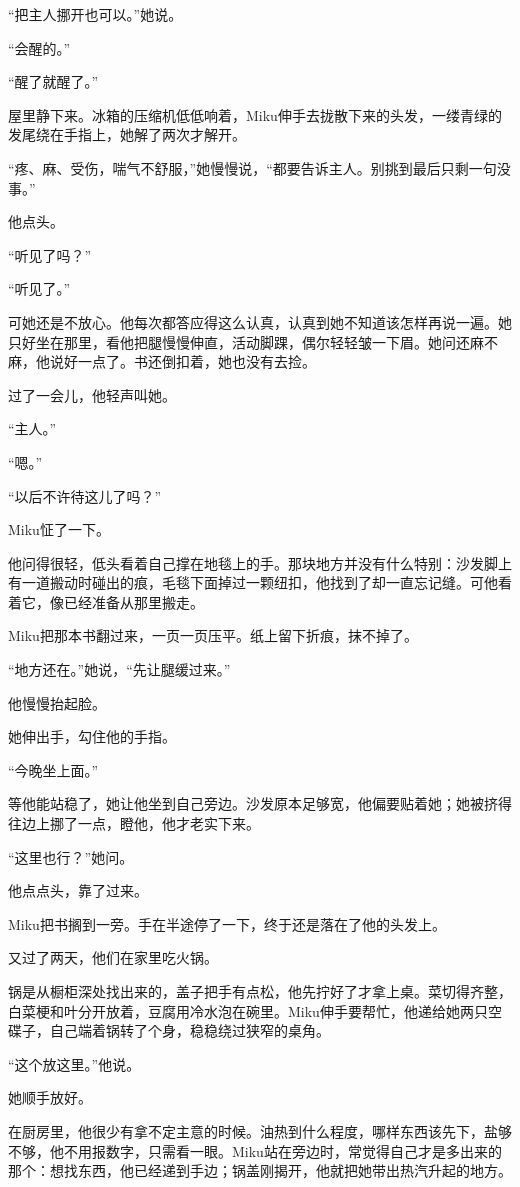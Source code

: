 “把主人挪开也可以。”她说。

“会醒的。”

“醒了就醒了。”

屋里静下来。冰箱的压缩机低低响着，Miku伸手去拢散下来的头发，一缕青绿的发尾绕在手指上，她解了两次才解开。

“疼、麻、受伤，喘气不舒服，”她慢慢说，“都要告诉主人。别挑到最后只剩一句没事。”

他点头。

“听见了吗？”

“听见了。”

可她还是不放心。他每次都答应得这么认真，认真到她不知道该怎样再说一遍。她只好坐在那里，看他把腿慢慢伸直，活动脚踝，偶尔轻轻皱一下眉。她问还麻不麻，他说好一点了。书还倒扣着，她也没有去捡。

过了一会儿，他轻声叫她。

“主人。”

“嗯。”

“以后不许待这儿了吗？”

Miku怔了一下。

他问得很轻，低头看着自己撑在地毯上的手。那块地方并没有什么特别：沙发脚上有一道搬动时碰出的痕，毛毯下面掉过一颗纽扣，他找到了却一直忘记缝。可他看着它，像已经准备从那里搬走。

Miku把那本书翻过来，一页一页压平。纸上留下折痕，抹不掉了。

“地方还在。”她说，“先让腿缓过来。”

他慢慢抬起脸。

她伸出手，勾住他的手指。

“今晚坐上面。”

等他能站稳了，她让他坐到自己旁边。沙发原本足够宽，他偏要贴着她；她被挤得往边上挪了一点，瞪他，他才老实下来。

“这里也行？”她问。

他点点头，靠了过来。

Miku把书搁到一旁。手在半途停了一下，终于还是落在了他的头发上。

\SceneBreak

又过了两天，他们在家里吃火锅。

锅是从橱柜深处找出来的，盖子把手有点松，他先拧好了才拿上桌。菜切得齐整，白菜梗和叶分开放着，豆腐用冷水泡在碗里。Miku伸手要帮忙，他递给她两只空碟子，自己端着锅转了个身，稳稳绕过狭窄的桌角。

“这个放这里。”他说。

她顺手放好。

在厨房里，他很少有拿不定主意的时候。油热到什么程度，哪样东西该先下，盐够不够，他不用报数字，只需看一眼。Miku站在旁边时，常觉得自己才是多出来的那个：想找东西，他已经递到手边；锅盖刚揭开，他就把她带出热汽升起的地方。

